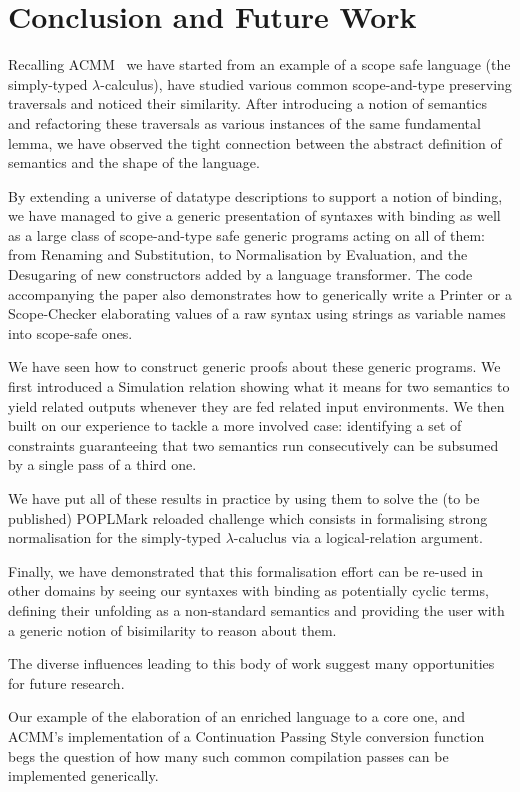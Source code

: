 \section{Conclusion and Future Work}

Recalling ACMM~\citeyear{allais2017type} we have started from an example
of a scope safe language (the simply-typed $\lambda$-calculus), have studied
various common scope-and-type preserving traversals and noticed their similarity.
After introducing a notion of semantics and refactoring these traversals as
various instances of the same fundamental lemma, we have observed the tight
connection between the abstract definition of semantics and the shape of the
language.

By extending a universe of datatype descriptions to support a notion of binding,
we have managed to give a generic presentation of syntaxes with binding as well
as a large class of scope-and-type safe generic programs acting on all of them:
from Renaming and Substitution, to Normalisation by Evaluation, and the Desugaring
of new constructors added by a language transformer. The code accompanying the
paper also demonstrates how to generically write a Printer or a Scope-Checker
elaborating values of a raw syntax using strings as variable names into scope-safe
ones.

We have seen how to construct generic proofs about these generic programs. We
first introduced a Simulation relation showing what it means for two semantics
to yield related outputs whenever they are fed related input environments. We
then built on our experience to tackle a more involved case: identifying a set
of constraints guaranteeing that two semantics run consecutively can be subsumed
by a single pass of a third one.

We have put all of these results in practice by using them to solve the (to be
published) POPLMark reloaded challenge which consists in formalising strong
normalisation for the simply-typed $\lambda$-caluclus via a logical-relation
argument.

Finally, we have demonstrated that this formalisation effort can be re-used
in other domains by seeing our syntaxes with binding as potentially cyclic
terms, defining their unfolding as a non-standard semantics and providing the
user with a generic notion of bisimilarity to reason about them.

The diverse influences leading to this body of work suggest many opportunities
for future research.

Our example of the elaboration of an enriched language to a core one, and ACMM's
implementation of a Continuation Passing Style conversion function begs the question
of how many such common compilation passes can be implemented generically.

